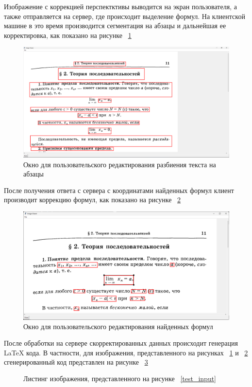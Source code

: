 Изображение с коррекцией перспектктивы выводится на экран пользователя, а также отправляется на сервер, где происходит выделение формул. На клиентской машине в это время производится сегментация на абзацы и дальнейшая ее корректировка, как показано на рисунке ~\ref{paragraph_segmentation_window}

\begin{figure}
    \includegraphics[scale=0.25]{img/app/paragraph_segmentation.png}
    \caption{Окно для пользовательского редактирования разбиения текста на абзацы}
    \label{paragraph_segmentation_window}
\end{figure}

После получения ответа с сервера с координатами найденных формул клиент производит коррекцию формул, как показано на рисунке ~\ref{formula_editor_window}

\begin{figure}
    \includegraphics[scale=0.25]{img/app/formula_editor_window.png}
    \caption{Окно для пользовательского редактирования найденных формул}
    \label{formula_editor_window}
\end{figure}

После обработки на сервере скорректированных данных происходит генерация \LaTeX\; кода. В частности, для изображения, представленного на рисунках ~\ref{paragraph_segmentation_window} и ~\ref{formula_editor_window} сгенерированный код представлен на рисунке ~\ref{test_listing}

\begin{figure}
    
    \caption{Листинг изображения, представленного на рисунке ~\ref{test_input}}
    \label{test_listing}
\end{figure}
